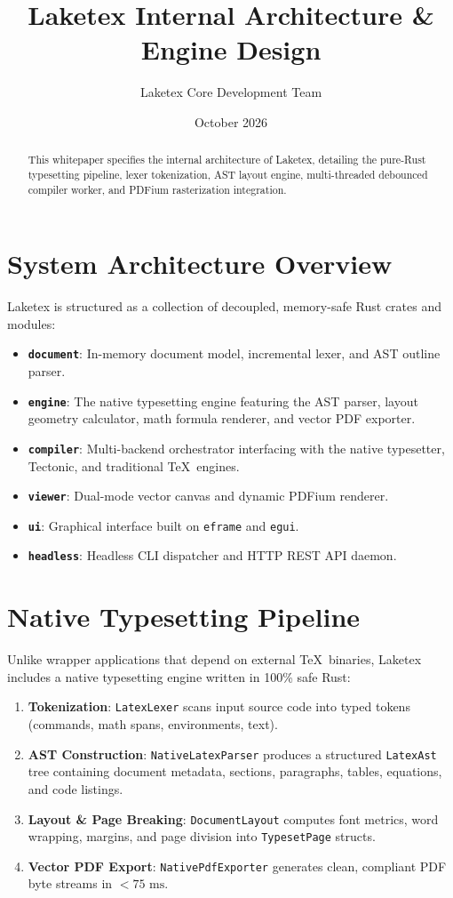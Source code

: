 \documentclass[11pt, a4paper]{article}
\title{\textbf{Laketex Internal Architecture \& Engine Design}}
\author{Laketex Core Development Team}
\date{October 2026}
\begin{document}
\maketitle

\begin{abstract}
This whitepaper specifies the internal architecture of Laketex, detailing the pure-Rust typesetting pipeline, lexer tokenization, AST layout engine, multi-threaded debounced compiler worker, and PDFium rasterization integration.
\end{abstract}

\section{System Architecture Overview}

Laketex is structured as a collection of decoupled, memory-safe Rust crates and modules:
\begin{itemize}
    \item \textbf{\texttt{document}}: In-memory document model, incremental lexer, and AST outline parser.
    \item \textbf{\texttt{engine}}: The native typesetting engine featuring the AST parser, layout geometry calculator, math formula renderer, and vector PDF exporter.
    \item \textbf{\texttt{compiler}}: Multi-backend orchestrator interfacing with the native typesetter, Tectonic, and traditional \TeX\ engines.
    \item \textbf{\texttt{viewer}}: Dual-mode vector canvas and dynamic PDFium renderer.
    \item \textbf{\texttt{ui}}: Graphical interface built on \texttt{eframe} and \texttt{egui}.
    \item \textbf{\texttt{headless}}: Headless CLI dispatcher and HTTP REST API daemon.
\end{itemize}

\section{Native Typesetting Pipeline}

Unlike wrapper applications that depend on external \TeX\ binaries, Laketex includes a native typesetting engine written in 100\% safe Rust:
\begin{enumerate}
    \item \textbf{Tokenization}: \texttt{LatexLexer} scans input source code into typed tokens (commands, math spans, environments, text).
    \item \textbf{AST Construction}: \texttt{NativeLatexParser} produces a structured \texttt{LatexAst} tree containing document metadata, sections, paragraphs, tables, equations, and code listings.
    \item \textbf{Layout \& Page Breaking}: \texttt{DocumentLayout} computes font metrics, word wrapping, margins, and page division into \texttt{TypesetPage} structs.
    \item \textbf{Vector PDF Export}: \texttt{NativePdfExporter} generates clean, compliant PDF byte streams in $< 75\text{ ms}$.
\end{enumerate}
\end{document}
